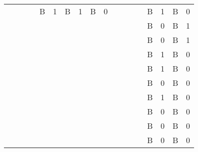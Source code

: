 \documentclass{article}
\begin{document}
\begin{table}
\begin{tabular}{c  c  c  c  c  c  c  c  c  c  c  c  c  c  c  c  c  c}
 &  &  &  & B & 1 & B & 1 & B & 0 &  &  &  &  & B & 1 & B & 0\\
 &  &  &  &  &  &  &  &  &  &  &  &  &  & B & 0 & B & 1\\
 &  &  &  &  &  &  &  &  &  &  &  &  &  & B & 0 & B & 1\\
 &  &  &  &  &  &  &  &  &  &  &  &  &  & B & 1 & B & 0\\
 &  &  &  &  &  &  &  &  &  &  &  &  &  & B & 1 & B & 0\\
 &  &  &  &  &  &  &  &  &  &  &  &  &  & B & 0 & B & 0\\
 &  &  &  &  &  &  &  &  &  &  &  &  &  & B & 1 & B & 0\\
 &  &  &  &  &  &  &  &  &  &  &  &  &  & B & 0 & B & 0\\
 &  &  &  &  &  &  &  &  &  &  &  &  &  & B & 0 & B & 0\\
 &  &  &  &  &  &  &  &  &  &  &  &  &  & B & 0 & B & 0\\


\end{tabular}
 

\end{table}
\end{document}
